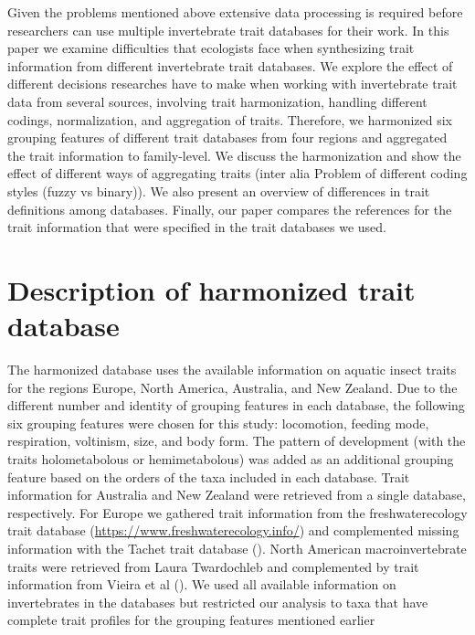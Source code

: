 \documentclass{article}
\begin{document}
Given the problems mentioned above extensive data processing is required before researchers 
can use multiple invertebrate trait databases for their work. 
In this paper we examine difficulties that ecologists face when synthesizing trait 
information from different invertebrate trait databases. We explore the effect of different
decisions researches have to make when working with invertebrate trait data 
from several sources, involving trait harmonization, handling different codings,
normalization, and aggregation of traits.
Therefore, we harmonized six grouping features of different trait databases from four
regions and aggregated the trait information to family-level. %
We discuss the harmonization and show the effect of different ways of aggregating 
traits (inter alia Problem of different coding styles (fuzzy vs binary)).
We also present an overview of differences in trait definitions among databases.
Finally, our paper compares the references for the trait information that 
were specified in the trait databases we used.


\section{Description of harmonized trait database} 

The harmonized database uses the available information on aquatic 
insect traits for the regions Europe, North America, Australia, and New Zealand. 
Due to the different number and identity of grouping features in each database, 
the following six grouping features were chosen for this study: locomotion, feeding mode, 
respiration, voltinism, size, and body form. 
The pattern of development (with the traits holometabolous or hemimetabolous) was added as
an additional grouping feature based on the orders of the taxa included in each database. 
Trait information for Australia and New Zealand were retrieved from 
a single database, respectively. For Europe we gathered trait information from the 
freshwaterecology trait database (\url{https://www.freshwaterecology.info/}) 
and complemented missing information with the 
Tachet trait database (\cite{usseglio-polatera_biomonitoring_2000}). 
North American macroinvertebrate traits were retrieved from Laura Twardochleb and 
complemented by trait information from Vieira et al (\cite{vieira_database_nodate}). 
We used all available information on invertebrates in the databases but restricted
our analysis to taxa that have complete trait profiles for the grouping features
mentioned earlier 
\end{document}
